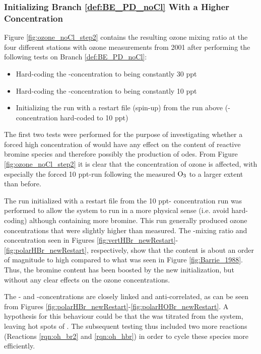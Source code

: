 \subsubsection{Initializing Branch \ref{def:BE_PD_noCl} With a Higher  Concentration}\label{sec:disc_step2}

Figure \ref{fig:ozone_noCl_step2} contains the resulting ozone mixing ratio at the four different stations with ozone measurements from 2001 after performing the following tests on Branch \ref{def:BE_PD_noCl}: 

\begin{itemize}
    \item Hard-coding the -concentration to being constantly 30 ppt 
    \item Hard-coding the -concentration to being constantly 10 ppt
    \item Initializing the run with a restart file (spin-up) from the run above (-concentration hard-coded to 10 ppt)
\end{itemize}

The first two tests were performed for the purpose of investigating whether a forced high concentration of  would have any effect on the content of reactive bromine species and therefore possibly the production of \acrshort{ode}s. From Figure \ref{fig:ozone_noCl_step2} it is clear that the concentration of ozone is affected, with especially the forced 10 ppt-run following the measured $\mathrm{O_3}$ to a larger extent than before. 

\medskip

The run initialized with a restart file from the 10 ppt- concentration run was performed to allow the system to run in a more physical sense (i.e. avoid hard-coding) although containing more bromine. This run generally produced ozone concentrations that were slightly higher than measured. The -mixing ratio and concentration seen in Figures \ref{fig:vertHBr_newRestart}-\ref{fig:polarHBr_newRestart}, respectively, show that the content is about an order of magnitude to high compared to what was seen in Figure \ref{fig:Barrie_1988}. Thus, the bromine content has been boosted by the new initialization, but without any clear effects on the ozone concentrations. 

\medskip

The - and -concentrations are closely linked and anti-correlated, as can be seen from Figures \ref{fig:polarHBr_newRestart}-\ref{fig:polarHOBr_newRestart}. A hypothesis for this behaviour could be that the  was titrated from the system, leaving hot spots of . The subsequent testing thus included two more reactions (Reactions \ref{rqn:oh_br2} and \ref{rqn:oh_hbr}) in order to cycle these species more efficiently. 

